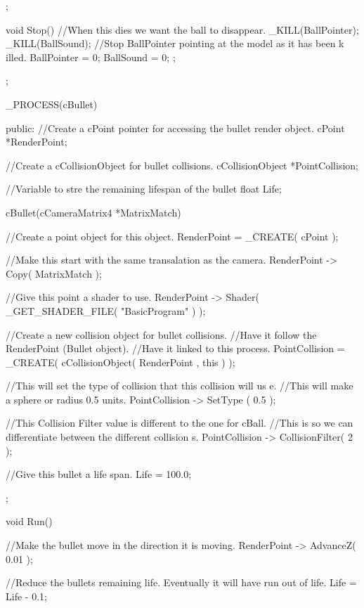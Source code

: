 \begin{DoxyCode}
{{        };

        void Stop()
        {
                        //When this dies we want the ball to disappear.
                _KILL(BallPointer);
                _KILL(BallSound);
                        //Stop BallPointer pointing at the model as it has been k
      illed.
                BallPointer = 0;
                BallSound = 0;
        };
};


_PROCESS(cBullet)
{
 public:
        //Create a cPoint pointer for accessing the bullet render object.
  cPoint *RenderPoint;

        //Create a cCollisionObject for bullet collisions.
  cCollisionObject *PointCollision;

   //Variable to stre the remaining lifespan of the bullet
  float Life;

   cBullet(cCameraMatrix4 *MatrixMatch)
   {
                //Create a point object for this object.
                RenderPoint = _CREATE( cPoint );

                //Make this start with the same transalation as the camera.
                RenderPoint -> Copy( MatrixMatch );

                //Give this point a shader to use.
                RenderPoint -> Shader( _GET_SHADER_FILE( "BasicProgram" ) );

                //Create a new collision object for bullet collisions.
                //Have it follow the RenderPoint (Bullet object).
                //Have it linked to this process.
                PointCollision = _CREATE( cCollisionObject( RenderPoint , this ) 
      );

                //This will set the type of collision that this collision will us
      e.
                //This will make a sphere or radius 0.5 units.
                PointCollision -> SetType ( 0.5 );

                //This Collision Filter value is different to the one for cBall.
                //This is so we can differentiate between the different collision
      s.
                PointCollision -> CollisionFilter( 2 );

                //Give this bullet a life span.
                Life = 100.0;
   };

   void Run()
   {
                //Make the bullet move in the direction it is moving.
                RenderPoint -> AdvanceZ( 0.01 );

                //Reduce the bullets remaining life. Eventually it will have run 
      out of life.
                Life = Life - 0.1;

}}
\end{DoxyCode}
